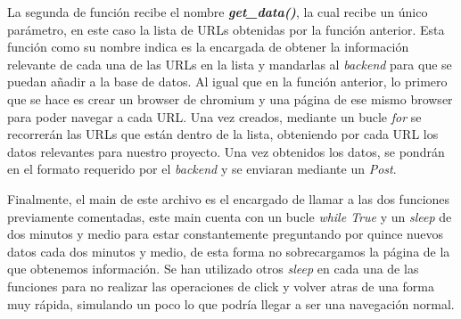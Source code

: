 La segunda de función recibe el nombre \textbf{\textit{get\_data()}}, la cual recibe un único parámetro, en este caso la lista de URLs obtenidas por la función anterior. Esta función como su nombre indica es la encargada de obtener la información relevante de cada una de las URLs en la lista y mandarlas al \textit{backend} para que se puedan añadir a la base de datos. Al igual que en la función anterior, lo primero que se hace es crear un browser de chromium y una página de ese mismo browser para poder navegar a cada URL. Una vez creados, mediante un bucle \textit{for} se recorrerán las URLs que están dentro de la lista, obteniendo por cada URL los datos relevantes para nuestro proyecto. Una vez obtenidos los datos, se pondrán en el formato requerido por el \textit{backend} y se enviaran mediante un \textit{Post}.

Finalmente, el main de este archivo es el encargado de llamar a las dos funciones previamente comentadas, este main cuenta con un bucle \textit{while True} y un \textit{sleep} de dos minutos y medio para estar constantemente preguntando por quince nuevos datos cada dos minutos y medio, de esta forma no sobrecargamos la página de la que obtenemos información. Se han utilizado otros \textit{sleep} en cada una de las funciones para no realizar las operaciones de click y volver atras de una forma muy rápida, simulando un poco lo que podría llegar a ser una navegación normal.
